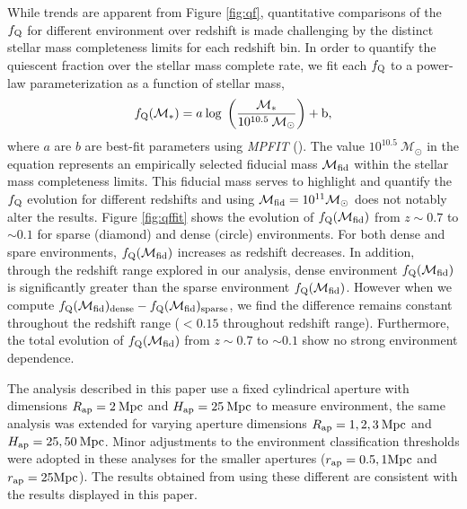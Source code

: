 \documentclass{emulateapj}
\begin{document}
While trends are apparent from Figure \ref{fig:qf}, quantitative comparisons of the 
$f_{\rm{Q}}$ for different environment over redshift is made challenging by the distinct stellar mass 
completeness limits for each redshift bin. In order to quantify the quiescent fraction over the stellar mass complete rate, we fit each $f_{\rm{Q}}$ to a power-law parameterization as a function of stellar mass, 
\begin{equation} 
f_{\rm{Q}}(\mathcal{M}_{*}) = a \: \rm{log} \; \left(\frac{ \mathcal{M}_{*}}{10^{10.5} \: \mathcal{M}_{\odot}} \right)+b,
\end{equation}
where $a$ are $b$ are best-fit parameters using {\em MPFIT} (\cite{Markwardt:2009aa}).
The value $10^{10.5} \: \mathcal{M}_{\odot}$ in the equation represents an empirically selected
fiducial mass $\mathcal{M}_{\rm{fid}}$ within the stellar mass completeness limits. This fiducial mass 
serves to highlight and quantify the $f_{\rm{Q}}$ evolution for different redshifts and using $\mathcal{M}_{\rm{fid}} = 10^{11} \mathcal{M}_\odot$ 
does not notably alter the results. Figure \ref{fig:qffit} shows the evolution of $f_{\rm{Q}}(\mathcal{M}_{\rm{fid}})$ from $z \sim 0.7$ to $\sim 0.1$ 
for sparse (diamond) and dense (circle) environments.
For both dense and spare environments, $f_{\rm{Q}}(\mathcal{M}_{\rm{fid}})$ increases as redshift decreases. In addition, through the redshift range explored in our analysis, dense environment $f_{\rm{Q}}(\mathcal{M}_{\rm{fid}})$ is significantly greater than the sparse environment $f_{\rm{Q}}(\mathcal{M}_{\rm{fid}})$. However when we compute $f_{\rm{Q}}(\mathcal{M}_{\rm{fid}})_{\rm{dense}} - f_{\rm{Q}}(\mathcal{M}_{\rm{fid}})_{\rm{sparse}}$, we find the difference remains constant throughout the redshift range ($ < 0.15$ throughout redshift range). Furthermore, the total evolution of $f_{\rm{Q}}(\mathcal{M}_{\rm{fid}})$ from $z \sim 0.7$ to $\sim 0.1$ show no strong environment dependence. 

The analysis described in this paper use a fixed cylindrical aperture with dimensions $R_{\rm{ap}} = 2 \: \rm{Mpc}$ and $H_{\rm{ap}} = 25 \: \rm{Mpc}$ to measure environment, the same analysis was extended for varying aperture dimensions $R_{\rm{ap}} = 1, 2, 3 \: \rm{Mpc}$ and $H_{\rm{ap}} = 25, 50 \: \rm{Mpc}$. 
Minor adjustments to the environment classification thresholds were adopted in these analyses for the smaller apertures ($r_{\rm{ap}} = 0.5, 1 \rm{Mpc}$ and $r_{\rm{ap}} = 25 \rm{Mpc}$).
The results obtained from using these different are consistent with the results displayed in this paper. 
\end{document}
